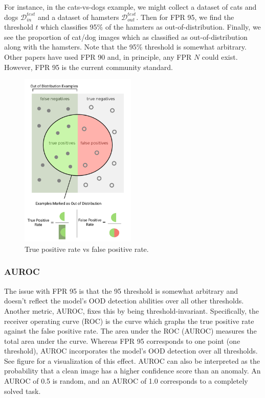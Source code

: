 \documentclass{article}
\newcommand{\D}{\mathcal{D}}
\begin{document}
For instance, in the cats-vs-dogs example, we might collect a dataset of cats and dogs $\D_{in}^{test}$ and a dataset of hamsters $\D_{out}^{test}$. Then for FPR 95, we find the threshold $t$ which classifies 95\% of the hamsters as out-of-distribution. Finally, we see the proportion of cat/dog images which as classified as out-of-distribution along with the hamsters. Note that the 95\% threshold is somewhat arbitrary. Other papers have used FPR 90 and, in principle, any FPR $N$ could exist. However, FPR 95 is the current community standard.


\begin{figure}
    \centering
    \includegraphics[width=5.5cm]{images/fpr_tpr.png}
    \caption{True positive rate vs false positive rate.}
    \label{fig:my_label}
\end{figure}

\subsubsection{AUROC}
The issue with FPR 95 is that the 95 threshold is somewhat arbitrary and doesn't reflect the model's OOD detection abilities over all other thresholds. Another metric, AUROC, fixes this by being threshold-invariant. Specifically, the receiver operating curve (ROC) is the curve which graphs the true positive rate against the false positive rate. The area under the ROC (AUROC) measures the total area under the curve. Whereas FPR 95 corresponds to one point (one threshold), AUROC incorporates the model's OOD detection over all thresholds. See figure  for a visualization of this effect. AUROC can also be interpreted as the probability that a clean image has a higher confidence score than an anomaly. An AUROC of 0.5 is random, and an AUROC of 1.0 corresponds to a completely solved task. 
\end{document}
